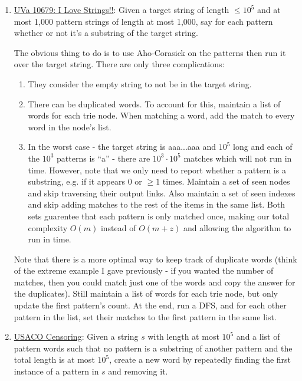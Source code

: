\documentclass[11pt, oneside]{article}
\begin{document}
\begin{enumerate}

  \item \href{https://onlinejudge.org/index.php?option=onlinejudge&page=show_problem&problem=1620}{UVa 10679: I Love Strings!!}:
  Given a target string of length \( \leq 10^5 \) and at most 1,000 pattern strings of length at most 1,000, say for each pattern
  whether or not it's a substring of the target string.

  The obvious thing to do is to use Aho-Corasick on the patterns then run it over the target string.
  There are only three complications:
  \begin{enumerate}
    \item They consider the empty string to not be in the target string.
    \item There can be duplicated words. To account for this, maintain a list of words for each trie node.
    When matching a word, add the match to every word in the node's list.
    \item In the worst case - the target string is aaa...aaa and \( 10^5 \) long and each of the \( 10^3 \) patterns is ``a'' -
    there are \( 10^3 \cdot 10^5 \) matches which will not run in time. However, note that we only need to report
    whether a pattern is a substring, e.g. if it appears 0 or \( \geq 1 \) times. Maintain a set of seen nodes and skip traversing their output links.
    Also maintain a set of seen indexes and skip adding matches to the rest of the items in the same list.
    Both sets guarentee that each pattern is only matched once, making our total complexity  \( O(m) \) instead
    of \( O(m + z) \) and allowing the algorithm to run in time.
  \end{enumerate}

  Note that there is a more optimal way to keep track of duplicate words
  (think of the extreme example I gave previously - if you wanted the number of matches,
  then you could match just one of the words and copy the answer for the duplicates).
  Still maintain a list of words for each trie node, but only update the first pattern's count.
  At the end, run a DFS, and for each other pattern in the list, set their matches to the first pattern in the same list.

  \item \href{http://www.usaco.org/index.php?page=viewproblem2&cpid=533}{USACO Censoring}:
  Given a string \( s \) with length at most \( 10^5 \) and a list of pattern words such that no pattern
  is a substring of another pattern and the total length is at most \( 10^5 \), create a new word
  by repeatedly finding the first instance of a pattern in \( s \) and removing it.


\end{enumerate}
\end{document}
